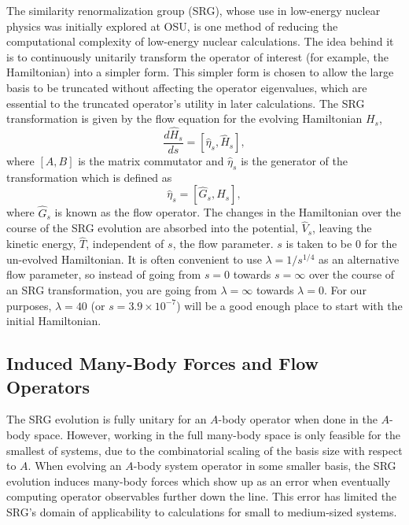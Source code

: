 The similarity renormalization group (SRG), whose use in low-energy nuclear physics was initially explored at OSU, is one method of reducing the computational complexity of low-energy nuclear calculations. The idea behind it is to continuously unitarily transform the operator of interest (for example, the Hamiltonian) into a simpler form. This simpler form is chosen to allow the large basis to be truncated without affecting the operator eigenvalues, which are essential to the truncated operator's utility in later calculations. The SRG transformation is given by the flow equation for the evolving Hamiltonian $H_s$,
\begin{equation}
\frac{d \hat{H}_s}{ds} = [\hat{\eta}_s, \hat{H}_s],
\end{equation}
where $[A, B]$ is the matrix commutator and $\hat{\eta}_s$ is the generator of the transformation which is defined as
\begin{equation}
\hat{\eta}_s = [\hat{G}_s, \hat{H}_s],
\end{equation}
where $\hat{G}_s$ is known as the flow operator. The changes in the Hamiltonian over the course of the SRG evolution are absorbed into the potential, $\hat{V}_s$, leaving the kinetic energy, $\hat{T}$, independent of $s$, the flow parameter. $s$ is taken to be 0 for the un-evolved Hamiltonian. It is often convenient to use $\lambda = 1 / s^{1/4}$ as an alternative flow parameter, so instead of going from $s=0$ towards $s=\infty$ over the course of an SRG transformation, you are going from $\lambda=\infty$ towards $\lambda=0$. For our purposes, $\lambda=40$ (or $s=3.9 \times 10^{-7}$) will be a good enough place to start with the initial Hamiltonian.

\subsection{Induced Many-Body Forces and Flow Operators}

The SRG evolution is fully unitary for an $A$-body operator when done in the $A$-body space. However, working in the full many-body space is only feasible for the smallest of systems, due to the combinatorial scaling of the basis size with respect to $A$. When evolving an $A$-body system operator in some smaller basis, the SRG evolution induces many-body forces which show up as an error when eventually computing operator observables further down the line. This error has limited the SRG's domain of applicability to calculations for small to medium-sized systems.

